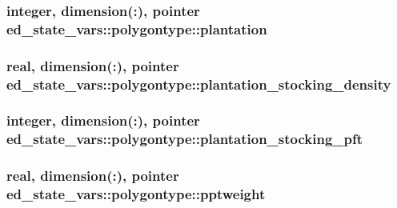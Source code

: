 \subsubsection[{\texorpdfstring{plantation}{plantation}}]{\setlength{\rightskip}{0pt plus 5cm}integer, dimension(\+:), pointer ed\+\_\+state\+\_\+vars\+::polygontype\+::plantation}\hypertarget{structed__state__vars_1_1polygontype_ae2cc347494c5af3a27157dd26a8a2c36}{}\label{structed__state__vars_1_1polygontype_ae2cc347494c5af3a27157dd26a8a2c36}
\subsubsection[{\texorpdfstring{plantation\+\_\+stocking\+\_\+density}{plantation_stocking_density}}]{\setlength{\rightskip}{0pt plus 5cm}real, dimension(\+:), pointer ed\+\_\+state\+\_\+vars\+::polygontype\+::plantation\+\_\+stocking\+\_\+density}\hypertarget{structed__state__vars_1_1polygontype_a11018002a68c2f5f2f41b49c67ec9499}{}\label{structed__state__vars_1_1polygontype_a11018002a68c2f5f2f41b49c67ec9499}
\subsubsection[{\texorpdfstring{plantation\+\_\+stocking\+\_\+pft}{plantation_stocking_pft}}]{\setlength{\rightskip}{0pt plus 5cm}integer, dimension(\+:), pointer ed\+\_\+state\+\_\+vars\+::polygontype\+::plantation\+\_\+stocking\+\_\+pft}\hypertarget{structed__state__vars_1_1polygontype_a5ed9365b65c8b366dd6d40eacdef2e54}{}\label{structed__state__vars_1_1polygontype_a5ed9365b65c8b366dd6d40eacdef2e54}
\subsubsection[{\texorpdfstring{pptweight}{pptweight}}]{\setlength{\rightskip}{0pt plus 5cm}real, dimension(\+:), pointer ed\+\_\+state\+\_\+vars\+::polygontype\+::pptweight}\hypertarget{structed__state__vars_1_1polygontype_a7d394ad04838244493b2ef2589e6ca25}{}\label{structed__state__vars_1_1polygontype_a7d394ad04838244493b2ef2589e6ca25}
